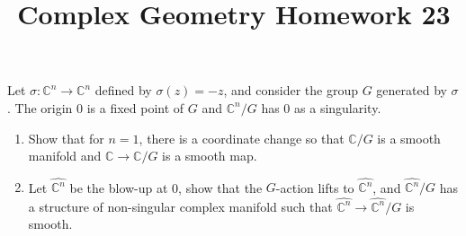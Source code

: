 \documentclass[12pt]{article}
\title{Complex Geometry Homework 23}
\author{}
\date{}
\begin{document}
\maketitle
\begin{problem}
  Let \(\sigma\colon\mathbb{C}^n\to \mathbb{C}^n\) defined by \(\sigma(z)=-z\),
  and consider the group \(G\) generated by \(\sigma\). The origin 0 is a fixed
  point of \(G\) and \(\mathbb{C}^n/G\) has 0 as a singularity.
  \begin{enumerate}[(1)]
  \item Show that for \(n=1\), there is a coordinate change so that \(\mathbb{C}
    /G\) is a smooth manifold and \(\mathbb{C}\to \mathbb{C}/G\) is a smooth
    map.
  \item Let \(\widehat{\mathbb{C}^n}\) be the blow-up at 0, show that the
    \(G\)-action lifts to \(\widehat{\mathbb{C}^n}\), and \(\widehat{\mathbb{C}^n
    }/G\) has a structure of non-singular complex manifold such that 
    \(\widehat{\mathbb{C}^n}\to \widehat{\mathbb{C}^n}/G\) is smooth.
  \end{enumerate}
\end{problem}
\end{document}
